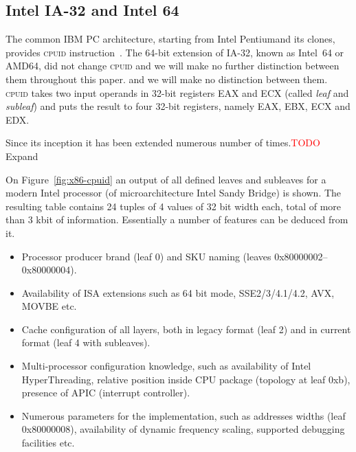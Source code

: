 \documentclass[a4paper,10pt,oneside,unicode]{article}
\newcommand{\cpuid}{\textsc{cpuid} }
\newcommand{\todo}[1][]{\textcolor{red}{TODO #1}}
\begin{document}
\subsection{Intel IA-32 and Intel 64}

The common IBM PC architecture, starting from Intel Pentium\texttrademark and its clones, provides \cpuid instruction~\cite{intelmanual-7vols, amd-sdm-vol1}. The 64-bit extension of IA-32, known as Intel~64 or AMD64, did not change \cpuid and we will make no further distinction between them throughout this paper. and we will make no distinction between them. \cpuid takes two input operands in 32-bit registers EAX and ECX (called \textit{leaf} and \textit{subleaf}) and puts the result to four 32-bit registers, namely EAX, EBX, ECX and EDX.

Since its inception it has been extended numerous number of times.\todo{Expand}

On Figure~\ref{fig:x86-cpuid} an output of all defined leaves and subleaves for a modern Intel processor (of microarchitecture Intel Sandy Bridge) is shown. The resulting table contains 24 tuples of 4 values of 32 bit width each, total of more than 3 kbit of information. Essentially a number of features can be deduced from it.

\begin{itemize}
    \item Processor producer brand (leaf 0) and SKU naming (leaves 0x80000002--0x80000004).
    \item Availability of ISA extensions such as 64 bit mode, SSE2/3/4.1/4.2, AVX, MOVBE etc.
    \item Cache configuration of all layers, both in legacy format (leaf 2) and in current format (leaf 4 with subleaves).
    \item Multi-processor configuration knowledge, such as availability of Intel HyperThreading, relative position inside {CPU} package (topology at leaf 0xb), presence of {APIC} (interrupt controller).
    \item Numerous parameters for the implementation, such as addresses widths (leaf 0x80000008), availability of dynamic frequency scaling, supported debugging facilities etc.
\end{itemize}
\end{document}
